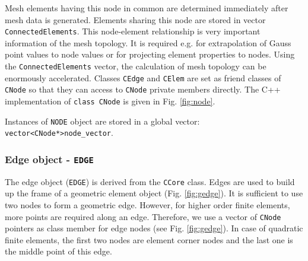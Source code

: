 Mesh elements having this node in common are determined immediately
after mesh data is generated. Elements sharing this node are stored
in vector \texttt{ConnectedElements}. This node-element relationship
is very important information of the mesh topology. It is required
e.g. for extrapolation of Gauss point values to node values or for
projecting element properties to nodes. Using the
\texttt{ConnectedElements} vector, the calculation of mesh topology
can be enormously accelerated.  Classes \texttt{CEdge} and \texttt{CElem} are
set as friend classes of \texttt{CNode} so that they can access to
\texttt{CNode} private members directly. The C++ implementation of
\texttt{class CNode} is given in Fig. \ref{fig:node}.

Instances of \texttt{NODE} object are stored in a global vector: \\
\texttt{vector<CNode*>node\_vector}.

\subsubsection{Edge object - \texttt{EDGE}}
\label{sec:edge}

The edge object (\texttt{EDGE}) is derived from the \texttt{CCore}
class. Edges are used to build up the frame of a geometric element
object (Fig. \ref{fig:gedge}). It is sufficient to use two nodes to
form a geometric edge. However, for higher order finite elements,
more points are required along an edge. Therefore, we use a vector
of \texttt{CNode} pointers as class member for edge nodes (see Fig.
\ref{fig:gedge}). In case of quadratic finite elements, the first
two nodes are element corner nodes and the last one is the middle
point of this edge.

